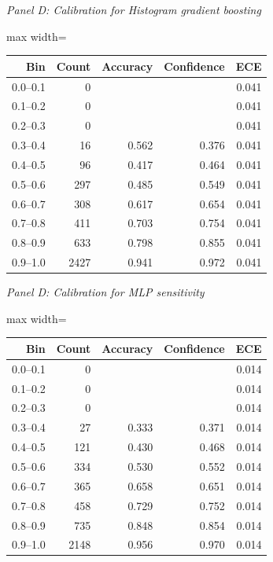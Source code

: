 \endgroup
\par\medskip\noindent\textit{Panel D: Calibration for Histogram gradient boosting}\par
\begingroup
\scriptsize
\setlength{\tabcolsep}{3pt}
\begin{center}
\begin{adjustbox}{max width=\linewidth}
\begin{tabular}{rrrrr}
\toprule
Bin & Count & Accuracy & Confidence & ECE \\
\midrule
0.0--0.1 & 0 &  &  & 0.041 \\
0.1--0.2 & 0 &  &  & 0.041 \\
0.2--0.3 & 0 &  &  & 0.041 \\
0.3--0.4 & 16 & 0.562 & 0.376 & 0.041 \\
0.4--0.5 & 96 & 0.417 & 0.464 & 0.041 \\
0.5--0.6 & 297 & 0.485 & 0.549 & 0.041 \\
0.6--0.7 & 308 & 0.617 & 0.654 & 0.041 \\
0.7--0.8 & 411 & 0.703 & 0.754 & 0.041 \\
0.8--0.9 & 633 & 0.798 & 0.855 & 0.041 \\
0.9--1.0 & 2427 & 0.941 & 0.972 & 0.041 \\
\bottomrule
\end{tabular}
\end{adjustbox}
\end{center}
\endgroup
\par\medskip\noindent\textit{Panel D: Calibration for MLP sensitivity}\par
\begingroup
\scriptsize
\setlength{\tabcolsep}{3pt}
\begin{center}
\begin{adjustbox}{max width=\linewidth}
\begin{tabular}{rrrrr}
\toprule
Bin & Count & Accuracy & Confidence & ECE \\
\midrule
0.0--0.1 & 0 &  &  & 0.014 \\
0.1--0.2 & 0 &  &  & 0.014 \\
0.2--0.3 & 0 &  &  & 0.014 \\
0.3--0.4 & 27 & 0.333 & 0.371 & 0.014 \\
0.4--0.5 & 121 & 0.430 & 0.468 & 0.014 \\
0.5--0.6 & 334 & 0.530 & 0.552 & 0.014 \\
0.6--0.7 & 365 & 0.658 & 0.651 & 0.014 \\
0.7--0.8 & 458 & 0.729 & 0.752 & 0.014 \\
0.8--0.9 & 735 & 0.848 & 0.854 & 0.014 \\
0.9--1.0 & 2148 & 0.956 & 0.970 & 0.014 \\
\bottomrule
\end{tabular}
\end{adjustbox}
\end{center}
\endgroup
